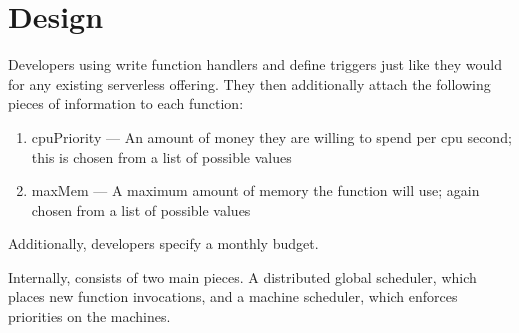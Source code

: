 \section{Design}

Developers using \sys{} write function handlers and define triggers just like they
would for any existing serverless offering. They then additionally attach the
following pieces of information to each function: 
\begin{enumerate}
  \item cpuPriority --- An amount of money they are willing to spend per cpu
  second; this is chosen from a list of possible values

  \item maxMem --- A maximum amount of memory the function will use; again chosen
  from a list of possible values
\end{enumerate}
Additionally, developers specify a monthly budget. 


Internally, \sys{} consists of two main pieces. A distributed global scheduler,
which places new function invocations, and a machine scheduler, which enforces
priorities on the machines.

